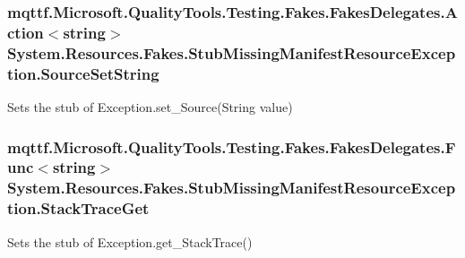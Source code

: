 \hypertarget{class_system_1_1_resources_1_1_fakes_1_1_stub_missing_manifest_resource_exception_afed0b0de9e36c9654638fb49e7e16ed9}{
\subsubsection[{Source\-Set\-String}]{\setlength{\rightskip}{0pt plus 5cm}mqttf.\-Microsoft.\-Quality\-Tools.\-Testing.\-Fakes.\-Fakes\-Delegates.\-Action$<$string$>$ System.\-Resources.\-Fakes.\-Stub\-Missing\-Manifest\-Resource\-Exception.\-Source\-Set\-String}}\label{class_system_1_1_resources_1_1_fakes_1_1_stub_missing_manifest_resource_exception_afed0b0de9e36c9654638fb49e7e16ed9}


Sets the stub of Exception.\-set\-\_\-\-Source(\-String value)

\hypertarget{class_system_1_1_resources_1_1_fakes_1_1_stub_missing_manifest_resource_exception_a52837b6910694f009856730747433d8a}{
\subsubsection[{Stack\-Trace\-Get}]{\setlength{\rightskip}{0pt plus 5cm}mqttf.\-Microsoft.\-Quality\-Tools.\-Testing.\-Fakes.\-Fakes\-Delegates.\-Func$<$string$>$ System.\-Resources.\-Fakes.\-Stub\-Missing\-Manifest\-Resource\-Exception.\-Stack\-Trace\-Get}}\label{class_system_1_1_resources_1_1_fakes_1_1_stub_missing_manifest_resource_exception_a52837b6910694f009856730747433d8a}


Sets the stub of Exception.\-get\-\_\-\-Stack\-Trace()

